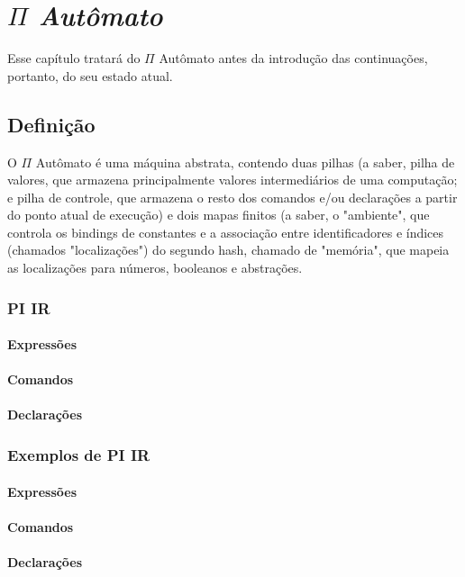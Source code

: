 \chapter{\textit{$\Pi$ Autômato}}\label{cap2}
Esse capítulo tratará do $\Pi$ Autômato antes da introdução das continuações, portanto, do seu estado atual.
\section{Definição}
O $\Pi$ Autômato é uma máquina abstrata, contendo duas pilhas (a saber, pilha de valores, que armazena principalmente valores intermediários de uma computação; e pilha de controle, que armazena o resto dos comandos e/ou declarações a partir do ponto atual de execução) e dois mapas finitos (a saber, o "ambiente", que controla os bindings de constantes e a associação entre identificadores e índices (chamados "localizações") do segundo hash, chamado de "memória", que mapeia as localizações para números, booleanos e abstrações.
\subsection{PI IR}
\subsubsection{Expressões}
\subsubsection{Comandos}
\subsubsection{Declarações}

\subsection{Exemplos de PI IR}
\subsubsection{Expressões}
\subsubsection{Comandos}
\subsubsection{Declarações}\label{declarações}
